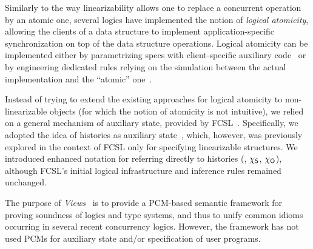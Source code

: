 Similarly to the way linearizability allows one to replace a
concurrent operation by an atomic one, several logics have implemented
the notion of \emph{logical atomicity}, allowing the clients of a data
structure to implement application-specific synchronization on top of
the data structure operations.
%
Logical atomicity can be implemented either by parametrizing specs
with client-specific auxiliary
code~\cite{Jacobs-Piessens:POPL11,Svendsen-al:ESOP13,Svendsen-Birkedal:ESOP14,Jung-al:POPL15}
or by engineering dedicated rules relying on the simulation between
the actual implementation and the ``atomic''
one~\cite{ArrozPincho-al:ECOOP14}.
%

Instead of trying to extend the existing approaches for logical
atomicity to non-linearizable objects (for which the notion of
atomicity is not intuitive), we relied on a general mechanism of
auxiliary state, provided by FCSL~\cite{Nanevski-al:ESOP14}. 
%
Specifically, we adopted the idea of histories as auxiliary
state~\cite{Sergey-al:ESOP15}, which, however, was previously explored
in the context of FCSL only for specifying linearizable structures.
%
%
% 
We introduced enhanced notation for referring directly to histories
(\eg, $\chi_{\mathsf{S}}$, $\chi_{\mathsf{O}}$), although FCSL's initial logical
infrastructure and inference rules remained unchanged.

The purpose of \emph{Views}~\cite{DinsdaleYoung-al:POPL13} is to provide a PCM-based semantic framework for proving soundness of logics and type systems, and thus to unify common idioms occurring in several recent concurrency logics. However, the framework has not used PCMs for auxiliary state and/or specification of user programs. 


